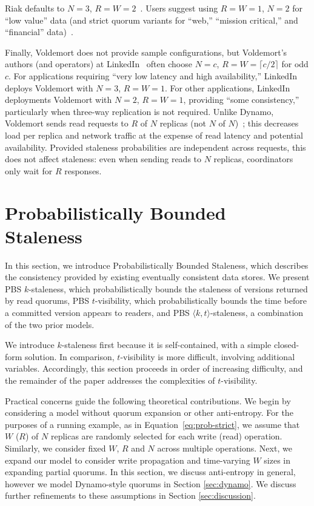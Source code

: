 \documentclass{vldb}
\newcommand{\sectionskip}{-0em}
\begin{document}
Riak defaults to $N$$=$$3$, $R$$=$$W$$=$$2$~\cite{riakdefault-n,
  riakdefault-rw}. Users suggest using $R$$=$$W$$=$$1$, $N$$=$$2$ for
``low value'' data (and strict quorum variants for ``web,''
``mission critical,'' and ``financial'' data)~\cite{riaktalkone,
  riaktalktwo}.

 Finally, Voldemort does not provide sample configurations, but
 Voldemort's authors (and operators) at LinkedIn~\cite{feinbergpc}
 often choose $N$$=$$c$, $R$$=$$W$$=$$ \lceil c/2 \rceil$ for odd $c$.
 For applications requiring ``very low latency and high
 availability,'' LinkedIn deploys Voldemort with $N$$=$$3$,
 $R$$=$$W$$=$$1$.  For other applications, LinkedIn deployments
 Voldemort with $N$$=$$2$, $R$$=$$W$$=$$1$, providing ``some
 consistency,'' particularly when three-way replication is not
 required.  Unlike Dynamo, Voldemort sends read requests to $R$ of $N$
 replicas (not $N$ of $N$)~\cite{voldemortpub}; this decreases load
 per replica and network traffic at the expense of read latency and
 potential availability.  Provided staleness probabilities are
 independent across requests, this does not affect staleness: even
 when sending reads to $N$ replicas, coordinators only wait for $R$
 responses.

\vspace{\sectionskip}\section{Probabilistically Bounded\\Staleness}
\label{sec:pbs}

In this section, we introduce Probabilistically Bounded Staleness,
which describes the consistency provided by existing eventually
consistent data stores.  We present PBS $k$-staleness, which
probabilistically bounds the staleness of versions returned by read
quorums, PBS $t$-visibility, which probabilistically bounds the time
before a committed version appears to readers, and PBS $\langle k, t
\rangle$-staleness, a combination of the two prior models.

We introduce $k$-staleness first because it is self-contained, with a
simple closed-form solution.  In comparison, $t$-visibility is more
difficult, involving additional variables.  Accordingly, this
section proceeds in order of increasing difficulty, and the remainder
of the paper addresses the complexities of $t$-visibility.

Practical concerns guide the following theoretical contributions.  We
begin by considering a model without quorum expansion or other
anti-entropy.  For the purposes of a running example, as in
Equation~\ref{eq:prob-strict}, we assume that $W$ ($R$) of $N$
replicas are randomly selected for each write (read) operation.
Similarly, we consider fixed $W$, $R$ and $N$ across multiple
operations. Next, we expand our model to consider write propagation
and time-varying $W$ sizes in expanding partial quorums.  In this
section, we discuss anti-entropy in general, however we model
Dynamo-style quorums in Section \ref{sec:dynamo}. We discuss further
refinements to these assumptions in Section \ref{sec:discussion}.
\end{document}
